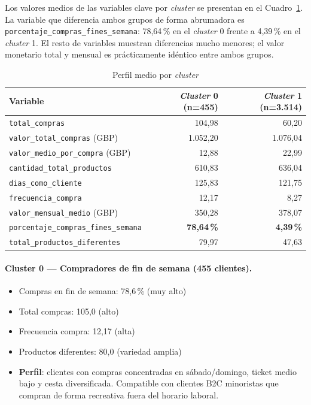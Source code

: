 \documentclass[11pt,a4paper]{article}
\begin{document}
Los valores medios de las variables clave por \textit{cluster} se presentan en el Cuadro~\ref{tab:perfil}. La variable que diferencia ambos grupos de forma abrumadora es \texttt{porcentaje\_compras\_fines\_semana}: 78,64\,\% en el \textit{cluster} 0 frente a 4,39\,\% en el \textit{cluster} 1. El resto de variables muestran diferencias mucho menores; el valor monetario total y mensual es prácticamente idéntico entre ambos grupos.

\begin{table}[h]
\centering
\caption{Perfil medio por \textit{cluster}}
\label{tab:perfil}
\begin{tabular}{lrr}
\toprule
\textbf{Variable} & \textbf{\textit{Cluster} 0 (n=455)} & \textbf{\textit{Cluster} 1 (n=3.514)} \\
\midrule
\texttt{total\_compras} & 104,98 & 60,20 \\
\texttt{valor\_total\_compras} (GBP) & 1.052,20 & 1.076,04 \\
\texttt{valor\_medio\_por\_compra} (GBP) & 12,88 & 22,99 \\
\texttt{cantidad\_total\_productos} & 610,83 & 636,04 \\
\texttt{dias\_como\_cliente} & 125,83 & 121,75 \\
\texttt{frecuencia\_compra} & 12,17 & 8,27 \\
\texttt{valor\_mensual\_medio} (GBP) & 350,28 & 378,07 \\
\texttt{porcentaje\_compras\_fines\_semana} & \textbf{78,64\,\%} & \textbf{4,39\,\%} \\
\texttt{total\_productos\_diferentes} & 79,97 & 47,63 \\
\bottomrule
\end{tabular}
\end{table}

\paragraph{Cluster 0 — Compradores de fin de semana (455 clientes).}
\begin{itemize}
    \item Compras en fin de semana: 78,6\,\% (muy alto)
    \item Total compras: 105,0 (alto)
    \item Frecuencia compra: 12,17 (alta)
    \item Productos diferentes: 80,0 (variedad amplia)
    \item \textbf{Perfil}: clientes con compras concentradas en sábado/domingo, ticket medio bajo y cesta diversificada. Compatible con clientes B2C minoristas que compran de forma recreativa fuera del horario laboral.
\end{itemize}
\end{document}
